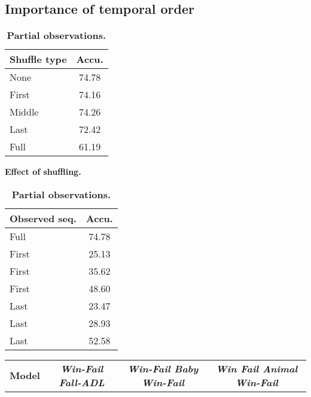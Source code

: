 \documentclass[final]{cvpr}
\begin{document}
\subsection{Importance of temporal order}
\label{sec:exp_scrambling}
\begin{table}[]
\small
    \begin{minipage}{.4\linewidth}
      \centering
\begin{tabular}{@{}lc@{}}
\toprule
\textbf{Shuffle type} & \textbf{Accu.} \\ \midrule
None                     & 74.78             \\
First                & 74.16             \\
Middle               & 74.26             \\
Last                 & 72.42             \\
Full                     & 61.19             \\ \bottomrule
\end{tabular}
\caption{\textbf{Effect of shuffling.}}
\label{tab:scrambling}
    \end{minipage}\hfill
\begin{minipage}{.5\linewidth}
    \centering
\begin{tabular}{@{}lc@{}}
\toprule
\textbf{Observed seq.} & \textbf{Accu.} \\ \midrule
Full                         & 74.78             \\ \midrule
First                       & 25.13             \\
First                       & 35.62             \\
First                       & 48.60             \\ \midrule
Last                        & 23.47             \\
Last                        & 28.93             \\
Last                        & 52.58             \\ \bottomrule
\end{tabular}
\caption{\textbf{Partial observations.}}
\label{tab:incomplete_seq}
    \end{minipage} 
\end{table} \begin{table*}[]
\small
\centering
\begin{tabular}{lllcllcllc}
\toprule
\multirow{2}{*}{\textbf{Model}} & \multicolumn{3}{c}{\textit{\textbf{Win-Fail  Fall-ADL}}}                 & \multicolumn{3}{c}{\textit{\textbf{Win-Fail  Baby Win-Fail}}}   & \multicolumn{3}{c}{\textit{\textbf{Win Fail  Animal Win-Fail}}}          \\ \cmidrule(l){2-4} \cmidrule(l){5-7} \cmidrule(l){8-10}

\end{tabular}
\end{table*}
\end{document}
